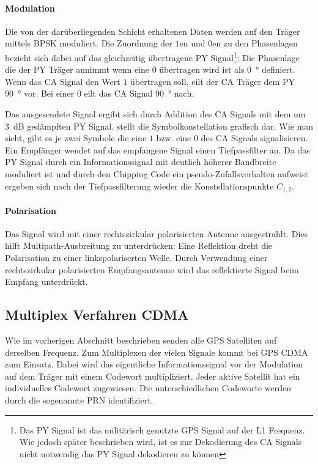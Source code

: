 \paragraph{Modulation}
Die von der darüberliegenden Schicht erhaltenen Daten werden auf den Träger mittels \gls{BPSK} moduliert. Die Zuordnung der $1$en und $0$en zu den Phasenlagen bezieht sich dabei auf das gleichzeitig übertragene \gls{PY} Signal\footnote{Das \gls{PY} Signal ist das militärisch genutzte GPS Signal auf der L1 Frequenz. Wie jedoch später beschrieben wird, ist es zur Dekodierung des \gls{CA} Signals nicht notwendig das \gls{PY} Signal dekodieren zu können}: Die Phasenlage die der \gls{PY} Träger annimmt wenn eine $0$ übertragen wird ist als \SI{0}{\degree} definiert. Wenn das \gls{CA} Signal den Wert $1$ übertragen soll, eilt der \gls{CA} Träger dem \gls{PY} \SI{90}{\degree} vor. Bei einer $0$ eilt das CA Signal \SI{90}{\degree} nach.

Das ausgesendete Signal ergibt sich durch Addition des \gls{CA} Signals mit dem um \SI{3}{\dB} gedämpften \gls{PY} Signal.  stellt die Symbolkonstellation grafisch dar. Wie man sieht, gibt es je zwei Symbole die eine $1$ bzw. eine $0$ des CA Signals signalisieren. Ein Empfänger wendet auf das empfangene Signal einen Tiefpassfilter an. Da das \gls{PY} Signal durch ein Informationssignal mit deutlich höherer Bandbreite moduliert ist und durch den Chipping Code ein pseudo-Zu\-falls\-ver\-hal\-ten aufweist ergeben sich nach der Tiefpassfilterung wieder die Konstellationspunkte $C_{1,2}$.


\paragraph{Polarisation} Das Signal wird mit einer rechtszirkular polarisierten Antenne ausgestrahlt. Dies hilft Multipath-Ausbreitung zu unterdrücken: Eine Reflektion dreht die Polarisation zu einer linkspolariserten Welle. Durch Verwendung einer rechtszirkular polarisierten Empfangsantenne wird das reflektierte Signal beim Empfang unterdrückt.

\subsection{Multiplex Verfahren \gls{CDMA}}
Wie im vorherigen Abschnitt beschrieben senden alle GPS Satelliten auf derselben Frequenz. Zum Multiplexen der vielen Signale kommt bei GPS \gls{CDMA} zum Einsatz. Dabei wird das eigentliche Informationssignal vor der Modulation auf dem Träger mit einem Codewort multipliziert. Jeder aktive Satellit hat ein individuelles Codewort zugewiesen. Die unterschiedlichen Codeworte werden durch die sogenannte \gls{PRN} identifiziert. 

